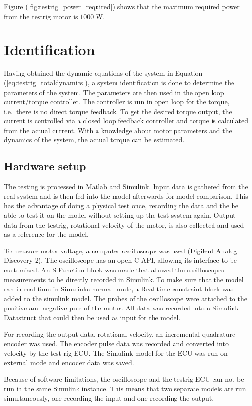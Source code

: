 Figure (\ref{fig:testrig_power_required}) shows that the maximum required power from the testrig motor is $1000$ W.

\section{Identification}
Having obtained the dynamic equations of the system in Equation
(\ref{eq:testrig_totaldynamics}), a system identification is done to determine
the parameters of the system. The parameters are then used in the open loop
current/torque controller. The controller is run in open loop for the
torque, i.e.\ there is no direct torque feedback. To get the desired torque
output, the current is controlled via a closed loop feedback controller and
torque is calculated from the actual current. With a knowledge about motor
parameters and the dynamics of the system, the actual torque can be estimated. 

\subsection{Hardware setup}
The testing is processed in Matlab and Simulink. Input data is gathered from the
real system and is then fed into the model afterwards for model comparison. This
has the advantage of doing a physical test once, recording the data and the be
able to test it on the model without setting up the test system again. Output
data from the testrig, rotational velocity of the motor, is also collected and
used as a reference for the model.

To measure motor voltage, a computer oscilloscope was used (Digilent Analog
Discovery 2). The oscilloscope has an open C API, allowing its interface to be
customized. An S-Function block was made that allowed the oscilloscopes
measurements to be directly recorded in Simulink. To make sure that the model
ran in real-time in Simulinks normal mode, a Real-time constraint block was
added to the simulink model. The probes of the oscilloscope were attached to
the positive and negative pole of the motor. All data was recorded into a
Simulink Datastruct that could then be used as input for the model. 

For recording the output data, rotational velocity, an incremental quadrature
encoder was used. The encoder pulse data was recorded and converted into
velocity by the test rig ECU\@. The Simulink model for the ECU was run on external
mode and encoder data was saved. 

Because of software limitations, the oscilloscope and the testrig ECU can not be
run in the same Simulink instance. This means that two separate models are run
simultaneously, one recording the input and one recording the output.

